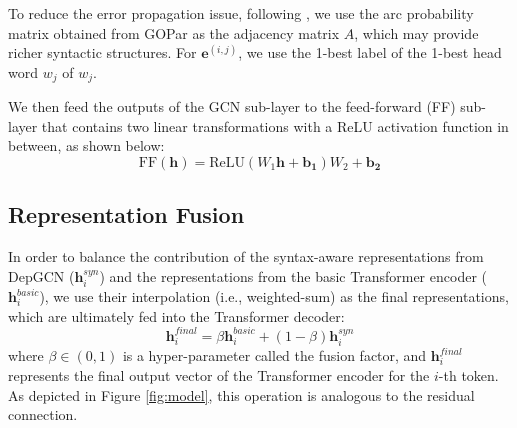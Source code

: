 \documentclass[11pt]{article}
\begin{document}
To reduce the error propagation issue, following \citet{DBLP:conf/acl/ZhangZWLZ20}, we use the arc probability matrix obtained from GOPar as the adjacency matrix $A$, which may provide richer  syntactic structures. For $\mathbf{e}^{(i,j)}$, we use the 1-best label of the 1-best head word $w_j$ of $w_j$. 


We then feed the outputs of the GCN sub-layer to the feed-forward (FF) sub-layer that contains two linear transformations with a ReLU activation function in between, as shown below:
\begin{equation}
    \mbox{FF}(\mathbf{h})=\mbox{ReLU}(W_1 \mathbf{h} + \mathbf{b_1})W_2 + \mathbf{b_2}
\end{equation}




\subsection{Representation Fusion} 

In order to balance the contribution of the syntax-aware representations from DepGCN ($\mathbf{h}_i^{syn}$) and the representations from the basic Transformer encoder ($\mathbf{h}_i^{basic}$), we use their interpolation (i.e., weighted-sum) as the final representations, which are ultimately fed into the Transformer decoder:
\begin{equation}
    \mathbf{h}_i^{final}= \beta {\mathbf{h}_i^{basic}} + (1-\beta)\mathbf{h}_i^{syn}
    \label{eq:agg}
\end{equation}
where $\beta\in(0,1)$ is a hyper-parameter called the fusion factor, and $\mathbf{h}_i^{final}$ represents the final output vector of the Transformer encoder for the $i$-th token. 
As depicted in Figure \ref{fig:model}, 
this operation is analogous to the residual connection.  























 
\end{document}
